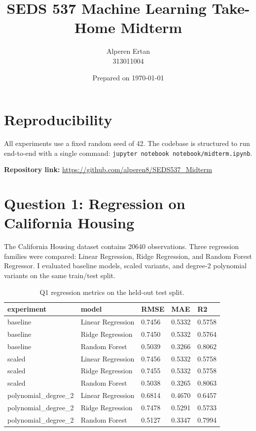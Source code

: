 \documentclass[11pt]{article}
\title{SEDS 537 Machine Learning Take-Home Midterm}
\author{Alperen Ertan \\ 313011004}
\date{Prepared on \today}
\begin{document}
\maketitle

\section*{Reproducibility}
All experiments use a fixed random seed of 42. The codebase is structured to run end-to-end with a single command:
\texttt{jupyter notebook notebook/midterm.ipynb}.

\noindent \textbf{Repository link:} \url{https://github.com/alperen8/SEDS537_Midterm}

\section{Question 1: Regression on California Housing}
The California Housing dataset contains 20640 observations. Three regression families were compared: Linear Regression, Ridge Regression, and Random Forest Regressor. I evaluated baseline models, scaled variants, and degree-2 polynomial variants on the same train/test split.

\begin{table}[H]
\centering
\begin{tabular}{lllll}
\toprule
experiment & model & RMSE & MAE & R2 \\
\midrule
baseline & Linear Regression & 0.7456 & 0.5332 & 0.5758 \\
baseline & Ridge Regression & 0.7450 & 0.5332 & 0.5764 \\
baseline & Random Forest & 0.5039 & 0.3266 & 0.8062 \\
scaled & Linear Regression & 0.7456 & 0.5332 & 0.5758 \\
scaled & Ridge Regression & 0.7455 & 0.5332 & 0.5758 \\
scaled & Random Forest & 0.5038 & 0.3265 & 0.8063 \\
polynomial\_degree\_2 & Linear Regression & 0.6814 & 0.4670 & 0.6457 \\
polynomial\_degree\_2 & Ridge Regression & 0.7478 & 0.5291 & 0.5733 \\
polynomial\_degree\_2 & Random Forest & 0.5127 & 0.3347 & 0.7994 \\
\bottomrule
\end{tabular}

\caption{Q1 regression metrics on the held-out test split.}
\end{table}
\end{document}
